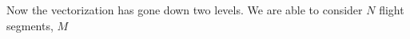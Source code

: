 %
%

Now the vectorization has gone down two levels. We are able to consider $N$ flight segments, $M$


